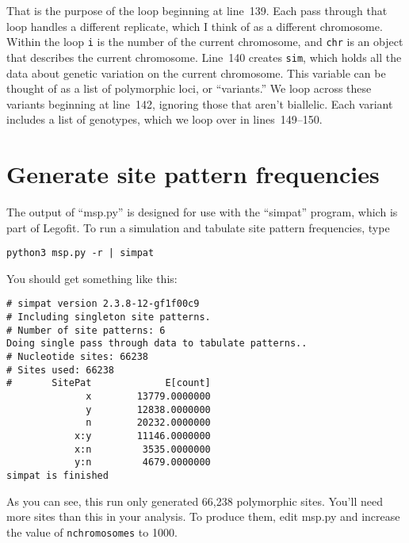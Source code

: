 \documentclass[11pt]{article}
\begin{document}
That is the purpose of the loop beginning at line~139. Each pass
through that loop handles a different replicate, which I think of as a
different chromosome. Within the loop \texttt{i} is the number of the
current chromosome, and \texttt{chr} is an object that describes the
current chromosome. Line~140 creates \texttt{sim}, which holds all the
data about genetic variation on the current chromosome. This variable
can be thought of as a list of polymorphic loci, or ``variants.'' We
loop across these variants beginning at line~142, ignoring those that
aren't biallelic.  Each variant includes a list of genotypes, which we
loop over in lines~149--150.

\section{Generate site pattern frequencies}
The output of ``msp.py'' is designed for use with the ``simpat''
program, which is part of Legofit. To run a simulation and tabulate
site pattern frequencies, type
\begin{verbatim}
python3 msp.py -r | simpat
\end{verbatim}
You should get something like this:
\begin{verbatim}
# simpat version 2.3.8-12-gf1f00c9
# Including singleton site patterns.
# Number of site patterns: 6
Doing single pass through data to tabulate patterns..
# Nucleotide sites: 66238
# Sites used: 66238
#       SitePat             E[count]
              x        13779.0000000
              y        12838.0000000
              n        20232.0000000
            x:y        11146.0000000
            x:n         3535.0000000
            y:n         4679.0000000
simpat is finished
\end{verbatim}
As you can see, this run only generated 66,238 polymorphic sites.
You'll need more sites than this in your analysis. To produce them,
edit msp.py and increase the value of \texttt{nchromosomes} to 1000.
\end{document}
